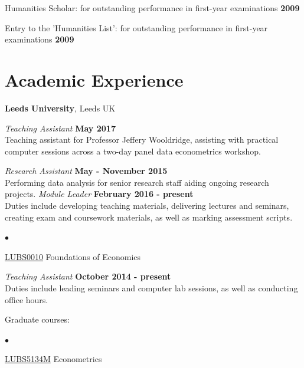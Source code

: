 \documentclass[margin,line,9pt]{res}
\newenvironment{list2}{
  \begin{list}{$\bullet$}{%
      \setlength{\itemsep}{0in}
      \setlength{\parsep}{0in} \setlength{\parskip}{0in}
      \setlength{\topsep}{0in} \setlength{\partopsep}{0in} 
      \setlength{\leftmargin}{0.2in}}}{\end{list}}
\begin{document}
\begin{resume}
\vspace*{-2.5mm}
Humanities Scholar: for outstanding performance in first-year examinations \hfill {\bf 2009}

\vspace*{-2.5mm}
Entry to the 'Humanities List': for outstanding performance in first-year examinations \hfill {\bf 2009}

\section{\sc Academic Experience}
{\bf Leeds University}, Leeds UK

\vspace{-.3cm}
{\em Teaching Assistant} \hfill {\bf May 2017}\\
Teaching assistant for Professor Jeffery Wooldridge, assisting with practical computer sessions across a two-day
panel data econometrics workshop. 

{\em Research Assistant} \hfill {\bf May - November 2015}\\
Performing data analysis for senior research staff aiding ongoing research projects.
\newpage
{\em Module Leader} \hfill {\bf February 2016  - present}\\
Duties include developing teaching materials, delivering lectures and seminars, 
creating exam and coursework materials, as well as marking assessment scripts.\\

\begin{list2}
\item \href{http://webprod3.leeds.ac.uk/catalogue/dynmodules.asp?Y=201617&F=P&M=LUBS-0010}{LUBS0010} Foundations of Economics
\end{list2}


{\em Teaching Assistant} \hfill {\bf October 2014  - present}\\
Duties include leading seminars and computer lab sessions, as well as conducting office hours.

Graduate courses:\\ 
\vspace*{-.1in}
\begin{list2}
\item \href{http://webprod3.leeds.ac.uk/catalogue/dynmodules.asp?Y=201415&M=LUBS-5134M}{LUBS5134M} Econometrics
\end{list2}


\end{resume}
\end{document}
